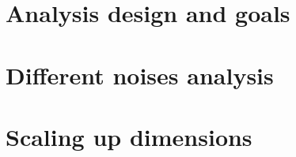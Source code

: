 \section{Analysis design and goals}
\section{Different noises analysis}
\section{Scaling up dimensions}
